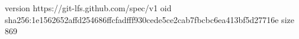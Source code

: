 version https://git-lfs.github.com/spec/v1
oid sha256:1e1562652affd254686ffcfadfff930cede5ce2cab7fbcbc6ea413bf5d27716e
size 869
